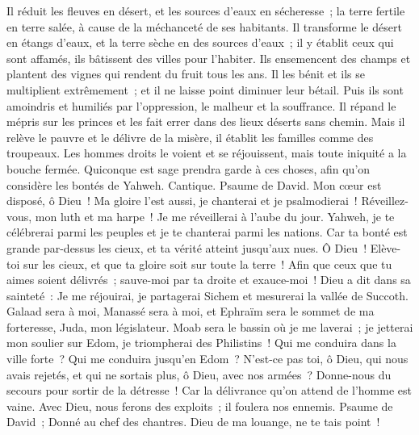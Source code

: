 \begin{multicols}{2}
Il réduit les fleuves en désert, et les sources d'eaux en sécheresse~;
la terre fertile en terre salée, à cause de la méchanceté de ses habitants.
Il transforme le désert en étangs d'eaux, et la terre sèche en des sources d'eaux~;
il y établit ceux qui sont affamés, ils bâtissent des villes pour l'habiter.
Ils ensemencent des champs et plantent des vignes qui rendent du fruit tous les ans.
Il les bénit et ils se multiplient extrêmement~; et il ne laisse point diminuer leur bétail.
Puis ils sont amoindris et humiliés par l'oppression, le malheur et la souffrance.
Il répand le mépris sur les princes et les fait errer dans des lieux déserts sans chemin.
Mais il relève le pauvre et le délivre de la misère, il établit les familles comme des troupeaux.
Les hommes droits le voient et se réjouissent, mais toute iniquité a la bouche fermée.
Quiconque est sage prendra garde à ces choses, afin qu'on considère les bontés de Yahweh.
\VerseOne{}Cantique. Psaume de David. Mon cœur est disposé, ô Dieu~! Ma gloire l'est aussi, je chanterai et je psalmodierai~!
Réveillez-vous, mon luth et ma harpe~! Je me réveillerai à l'aube du jour.
Yahweh, je te célébrerai parmi les peuples et je te chanterai parmi les nations.
Car ta bonté est grande par-dessus les cieux, et ta vérité atteint jusqu'aux nues.
Ô Dieu~! Elève-toi sur les cieux, et que ta gloire soit sur toute la terre~!
Afin que ceux que tu aimes soient délivrés~; sauve-moi par ta droite et exauce-moi~!
Dieu a dit dans sa sainteté~: Je me réjouirai, je partagerai Sichem et mesurerai la vallée de Succoth.
Galaad sera à moi, Manassé sera à moi, et Ephraïm sera le sommet de ma forteresse, Juda, mon législateur.
Moab sera le bassin où je me laverai~; je jetterai mon soulier sur Edom, je triompherai des Philistins~!
Qui me conduira dans la ville forte~? Qui me conduira jusqu'en Edom~?
N'est-ce pas toi, ô Dieu, qui nous avais rejetés, et qui ne sortais plus, ô Dieu, avec nos armées~?
Donne-nous du secours pour sortir de la détresse~! Car la délivrance qu'on attend de l'homme est vaine.
Avec Dieu, nous ferons des exploits~; il foulera nos ennemis.
\VerseOne{}Psaume de David~; Donné au chef des chantres. Dieu de ma louange, ne te tais point~!

\end{multicols}
